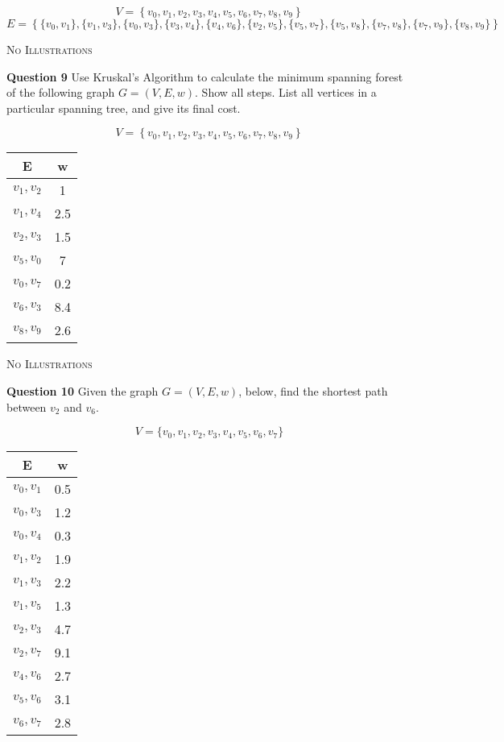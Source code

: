 \documentclass{letter}
\begin{document}
\begin{equation*}
V = \left \{ v_0, v_1, v_2, v_3, v_4, v_5, v_6, v_7, v_8, v_9 \right \}
\end{equation*}
\begin{equation*}
E = \left \{ \{ v_0, v_1 \}, \{ v_1, v_3 \}, \{ v_0, v_3 \}, \{ v_3, v_4 \}, \{ v_4, v_6 \}, \{ v_2, v_5 \}, \{ v_5, v_7 \}, \{ v_5, v_8 \}, \{ v_7, v_8 \}, \{ v_7, v_9 \}, \{ v_8, v_9 \} \right \}
\end{equation*}

\clearpage

{\huge \textsc{No Illustrations}}

\vspace{1cm}

{\bf Question 9} \kern 1cm Use Kruskal's Algorithm to calculate the minimum
spanning forest of the following graph $G = (V, E, w)$.  Show all steps.  List
all vertices in a particular spanning tree, and give its final cost.

\begin{equation*}
V = \left \{ v_0, v_1, v_2, v_3, v_4, v_5, v_6, v_7, v_8, v_9 \right \}
\end{equation*}

\begin{tabular}{ c | c }
E & w \\ \hline
$v_1,v_2$ & 1 \\
$v_1,v_4$ & 2.5 \\
$v_2,v_3$ & 1.5 \\
$v_5,v_0$ & 7 \\
$v_0,v_7$ & 0.2 \\
$v_6,v_3$ & 8.4 \\
$v_8,v_9$ & 2.6 \\
\end{tabular}

\clearpage

{\huge \textsc{No Illustrations}}

\vspace{1cm}

{\bf Question 10} \kern 1cm Given the graph $G = (V, E, w)$, below, find the
shortest path between $v_2$ and $v_6$.

\begin{equation*}
V = \{ v_0, v_1, v_2, v_3, v_4, v_5, v_6, v_7 \}
\end{equation*}

\begin{tabular}{ c | c }
E & w \\ \hline
$v_0,v_1$ & 0.5 \\
$v_0,v_3$ & 1.2 \\
$v_0,v_4$ & 0.3 \\
$v_1,v_2$ & 1.9 \\
$v_1,v_3$ & 2.2 \\
$v_1,v_5$ & 1.3 \\
$v_2,v_3$ & 4.7 \\
$v_2,v_7$ & 9.1 \\
$v_4,v_6$ & 2.7 \\
$v_5,v_6$ & 3.1 \\
$v_6,v_7$ & 2.8 \\
\end{tabular}
\end{document}
